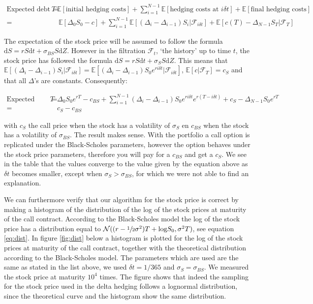 \documentclass[11pt,a4paper]{article}
\begin{document}
\begin{align}
\text{Expected debt at $T$}=~&\mathbb{E}[\text{initial hedging costs}]+\sum_{i=1}^{N-1}\mathbb{E}[\text{hedging costs at $i\delta t$}]+\mathbb{E}[\text{final hedging costs}] \nonumber \\
=&~\mathbb{E}[\Delta_0S_0-c]+\sum_{i=1}^{N-1}\mathbb{E}[(\Delta_i-\Delta_{i-1})S_i|\mathcal{F}_{i\delta t}]+\mathbb{E}[c(T)-\Delta_{N-1}S_T|\mathcal{F}_{T}]
\end{align}

The expectation of the stock price will be assumed to follow the formula $\mathrm{d}S=rS\mathrm{d}t+\sigma_{BS}S\mathrm{d}Z$. However in the filtration $\mathcal{F}_t$, `the history' up to time $t$, the stock price has followed the formula $\mathrm{d}S=rS\mathrm{d}t+\sigma_{S}S\mathrm{d}Z$. This means that $\mathbb{E}[(\Delta_i-\Delta_{i-1})S_i|\mathcal{F}_{i\delta t}]=\mathbb{E}[(\Delta_i-\Delta_{i-1})S_0e^{ri\delta t}|\mathcal{F}_{i\delta t}]$, $\mathbb{E}[c|\mathcal{F}_{T}]=c_S$ and that all $\Delta$'s are constants. Consequently:

\begin{align}
\text{Expected debt at $T$}=&~\Delta_0S_0e^{rT}-c_{BS}+\sum_{i=1}^{N-1}(\Delta_i-\Delta_{i-1})S_0e^{ri\delta t}e^{r(T-i\delta t)}+c_S-\Delta_{N-1}S_0e^{rT} \nonumber\\
=&~c_S-c_{BS}
\end{align}

with $c_S$ the call price when the stock has a volatility of $\sigma_S$ en $c_{BS}$ when the stock has a volatility of $\sigma_{BS}$. The result makes sense. With the portfolio a call option is replicated under the Black-Scholes parameters, however the option behaves under the stock price parameters, therefore you will pay for a $c_{BS}$ and get a $c_S$. We see in the table that the values converge to the value given by the equation above as $\delta t$ becomes smaller, except when $\sigma_S > \sigma_{BS}$, for which we were not able to find an explanation.

We can furthermore verify that our algorithm for the stock price is correct by making a histogram of the distribution of the log of the stock prices at maturity of the call contract. According to the Black-Scholes model the log of the stock price has a distribution equal to $\mathcal{N}((r-\sfrac{1}{2}\sigma^2)T + \text{log}S_0,\sigma^2T)$, see equation \ref{eq:dist}. In figure \ref{fig:dist} below a histogram is plotted for the log of the stock prices at maturity of the call contract, together with the theoretical distribution according to the Black-Scholes model. The parameters which are used are the same as stated in the list above, we used $\delta t = 1/365$ and $\sigma_S = \sigma_{BS}$. We measured the stock price at maturity $10^4$ times. The figure shows that indeed the sampling for the stock price used in the delta hedging follows a lognormal distribution, since the theoretical curve and the histogram show the same distribution.
\end{document}
